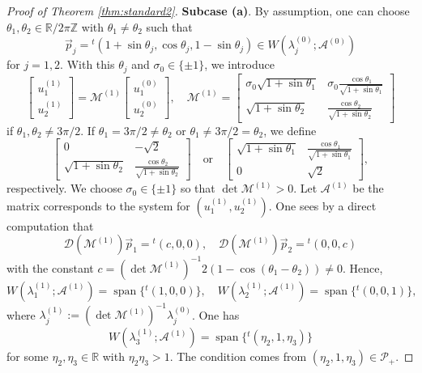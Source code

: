 \documentclass[11pt,a4paper,twosides]{amsart}
\theoremstyle{plain}
\theoremstyle{remark}
\numberwithin{equation}{section}
\newcommand{\R}{\mathbb{R}}
\newcommand{\Z}{\mathbb{Z}}
\DeclareMathOperator{\Span}{span}
\theoremstyle{definition}
\newcommand{\1}{{\bf 1}_{\{|x| < |t|\}}}
\begin{document}
\begin{proof}[Proof of Theorem \ref{thm:standard2}]
{\bf Subcase (a)}. 
By assumption, one can choose $\theta_1 ,\theta_2 \in \R/2\pi \Z$ with $\theta_1\neq \theta_2$ such that
\[
	\vec{p}_j = 
	{}^t\!(
	 1+ \sin \theta_j,
	 \cos \theta_j,
	  1- \sin \theta_j )\in W(\lambda_j^{(0)};\mathscr{A}^{(0)}) \]
for $j=1,2$. With this $\theta_j$ and $\sigma_0\in \{ \pm1\}$,
we introduce
\[
	\begin{bmatrix}
	u_1^{(1)}\\
	u_2^{(1)}
	\end{bmatrix}
	=
	\mathscr{M}^{(1)}
	\begin{bmatrix}
	u_1^{(0)}\\
	u_2^{(0)}
	\end{bmatrix}, \quad
	\mathscr{M}^{(1)}=\begin{bmatrix}
	\sigma_0\sqrt{1+\sin \theta_1} & \sigma_0 \frac{\cos \theta_1}{\sqrt{1+\sin \theta_1}} \\
	\sqrt{1+\sin \theta_2} &  \frac{\cos \theta_2}{\sqrt{1+\sin \theta_2}}
	\end{bmatrix}
\]
if $\theta_1,\theta_2\neq3\pi/2$.
If $\theta_1=3\pi/2 \neq \theta_2$
or $\theta_1 \neq 3\pi/2 = \theta_2$, we define 
\[
	\begin{bmatrix}
0 & -\sqrt2 \\
	\sqrt{1+\sin \theta_2} &  \frac{\cos \theta_2}{\sqrt{1+\sin \theta_2}}
	\end{bmatrix}\quad \text{or}\quad
	\begin{bmatrix}
	\sqrt{1+\sin \theta_1} & \frac{\cos \theta_1}{\sqrt{1+\sin \theta_1}} \\
	0 & \sqrt{2}
	\end{bmatrix},
\]
respectively. We choose $\sigma_0 \in \{\pm1\}$ so that $\det \mathscr{M}^{(1)}>0$.
Let $\mathscr{A}^{(1)}$ be the matrix corresponds to the system for $(u_1^{(1)},u_2^{(1)})$. One sees by a direct computation that
\[
	\mathscr{D}(\mathscr{M}^{(1)}) \vec{p}_1 = {}^t\!(c,0,0), \quad
	\mathscr{D}(\mathscr{M}^{(1)}) \vec{p}_2 = {}^t\!(0,0,c)
\]
with the constant $c=(\det\mathscr{M}^{(1)})^{-1} 2(1-\cos (\theta_1-\theta_2)) \neq0$.
Hence,
\[
	W(\lambda_1^{(1)};\mathscr{A}^{(1)}) = \Span\{{}^t\!(1,0,0)\}, \quad
	W(\lambda_2^{(1)};\mathscr{A}^{(1)}) = \Span\{{}^t\!(0,0,1)\},
\]
where $\lambda_j^{(1)}:=(\det \mathscr{M}^{(1)})^{-1} \lambda_j^{(0)}$.
One has
\[
	W(\lambda_3^{(1)};\mathscr{A}^{(1)}) = \Span\{{}^t\!(\eta_2,1,\eta_3)\}
\]
for some $\eta_2,\eta_3\in\R$ with
$\eta_2\eta_3>1$. The condition comes from $(\eta_2,1,\eta_3) \in \mathcal{P}_+$.


\end{proof}
\end{document}
